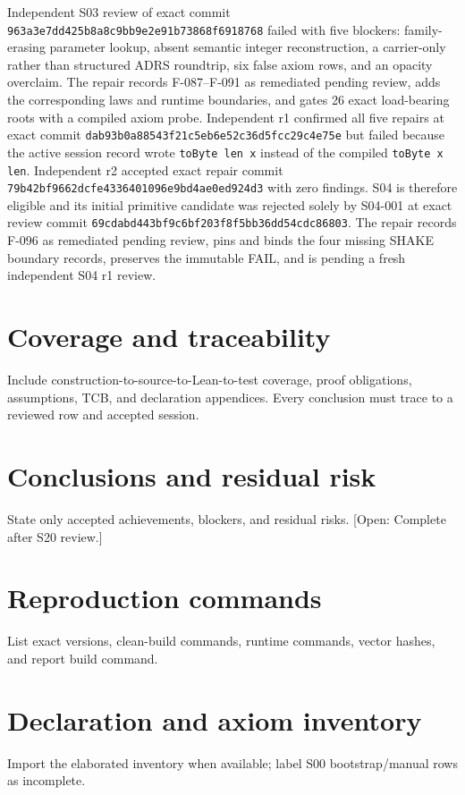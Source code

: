 \documentclass[11pt]{article}
\newcommand{\todo}[1]{\textcolor{red!70!black}{[Open: #1]}}
\begin{document}
Independent S03 review of exact commit
\texttt{963a3e7dd425b8a8c9bb9e2e91b73868f6918768} failed with five blockers: family-erasing
parameter lookup, absent semantic integer reconstruction, a carrier-only rather than structured
ADRS roundtrip, six false axiom rows, and an opacity overclaim. The repair records F-087--F-091 as
remediated pending review, adds the corresponding laws and runtime boundaries, and gates 26 exact
load-bearing roots with a compiled axiom probe. Independent r1 confirmed all five repairs at exact
commit \texttt{dab93b0a88543f21c5eb6e52c36d5fcc29c4e75e} but failed because the active
session record wrote \texttt{toByte len x} instead of the compiled \texttt{toByte x len}.
Independent r2 accepted exact repair commit
\texttt{79b42bf9662dcfe4336401096e9bd4ae0ed924d3} with zero findings. S04 is therefore eligible and its
initial primitive candidate was rejected solely by S04-001 at exact review commit
\texttt{69cdabd443bf9c6bf203f8f5bb36dd54cdc86803}. The repair records F-096 as remediated pending
review, pins and binds the four missing SHAKE boundary records, preserves the immutable FAIL, and
is pending a fresh independent S04 r1 review.

\section{Coverage and traceability}
Include construction-to-source-to-Lean-to-test coverage, proof obligations, assumptions, TCB, and
declaration appendices. Every conclusion must trace to a reviewed row and accepted session.

\section{Conclusions and residual risk}
State only accepted achievements, blockers, and residual risks. \todo{Complete after S20 review.}

\appendix
\section{Reproduction commands}
List exact versions, clean-build commands, runtime commands, vector hashes, and report build command.

\section{Declaration and axiom inventory}
Import the elaborated inventory when available; label S00 bootstrap/manual rows as incomplete.



\end{document}

